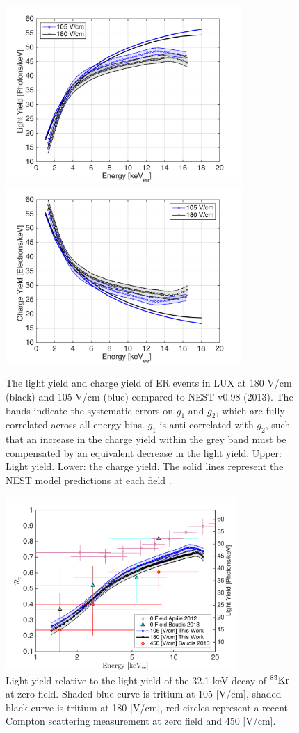 \begin{figure}[h!]\centering
\includegraphics[width=90mm]{fig/ER_LY.png}
\includegraphics[width=90mm]{fig/ER_QY.png}
\caption{The light yield and charge yield of ER events in LUX at 180 V/cm (black) and 105 V/cm (blue) compared to NEST v0.98 (2013). The bands indicate the systematic errors on $g_1$ and $g_2$, which are fully correlated across all energy bins. $g_1$ is anti-correlated with $g_2$, such that an increase in the charge yield within the grey band must be compensated by an equivalent decrease in the light yield. Upper: Light yield. Lower: the charge yield. The solid lines represent the NEST model predictions at each field \cite{NEST_2013}.}
\label{fig:ER-LY-QY}
\end{figure}

 \begin{figure}[h!]\centering
\includegraphics[width=88mm]{fig/Re_LY_log.png}
\caption{Light yield relative to the light yield of the 32.1 keV decay of $\rm^{83}Kr $ at zero field. Shaded blue curve is tritium at 105 [V/cm], shaded black curve is tritium at 180 [V/cm], red circles represent a recent Compton scattering measurement at zero field and 450 [V/cm]. }
\label{fig:Re_LY}
\end{figure}


